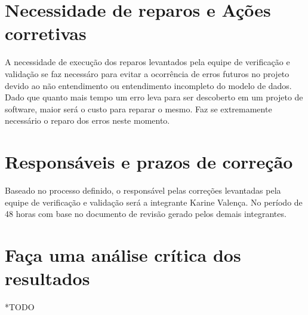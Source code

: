 \section{Necessidade de reparos e Ações corretivas}

A necessidade de execução dos reparos levantados pela equipe de verificação e validação se faz necessáro para evitar
a ocorrência de erros futuros no projeto devido ao não entendimento ou entendimento incompleto do modelo de dados.
Dado que quanto mais tempo um erro leva para ser descoberto em um projeto de software, maior será o custo para reparar o mesmo.
Faz se extremamente necessário o reparo dos erros neste momento.

\section{Responsáveis e prazos de correção}

Baseado no processo definido, o responsável pelas correções levantadas pela equipe de verificação e validação será a integrante Karine
Valença. No período de 48 horas com base no documento de revisão gerado pelos demais integrantes.

\section{Faça uma análise crítica dos resultados}

*TODO
